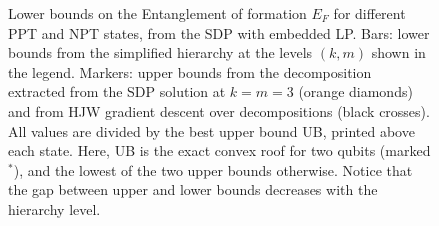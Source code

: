 %
\begin{figure}
  \centering
    \caption{Lower bounds on the Entanglement of formation $E_F$ for different PPT and NPT states, from the SDP with embedded LP. Bars: lower bounds from the simplified hierarchy at the levels $(k,m)$ shown in the legend. Markers: upper bounds from the decomposition extracted from the SDP solution at $k=m=3$ (orange diamonds) and from HJW gradient descent over decompositions (black crosses). All values are divided by the best upper bound UB, printed above each state. Here, UB is the exact convex roof for two qubits (marked $^*$), and the lowest of the two upper bounds otherwise. Notice that the gap between upper and lower bounds decreases with the hierarchy level.}
  \label{fig:EoF}
\end{figure}